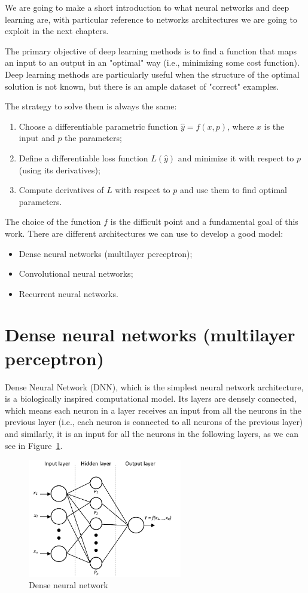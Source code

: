We are going to make a short introduction to what neural networks and deep learning are, with particular reference to networks architectures we are going to exploit in the next chapters.

The primary objective of deep learning methods is to find a function that maps an input to an output in an "optimal" way (i.e., minimizing some cost function). Deep learning methods are particularly useful when the structure of the optimal solution is not known, but there is an ample dataset of "correct" examples.

The strategy to solve them is always the same: 
\begin{enumerate}
    \item Choose a differentiable parametric function $\hat{y} = f(x,p)$, where $x$ is the input and $p$ the parameters;
    \item Define a differentiable loss function $L(\hat{y})$ and minimize it with respect to $p$ (using its derivatives);
    \item Compute derivatives of $L$ with respect to $p$ and use them to find optimal parameters.
\end{enumerate}

The choice of the function $f$ is the difficult point and a fundamental goal of this work. There are different architectures we can use to develop a good model:
\begin{itemize}
    \item Dense neural networks (multilayer perceptron);
    \item Convolutional neural networks;
    \item Recurrent neural networks.
\end{itemize}

\section{Dense neural networks (multilayer perceptron)}
Dense Neural Network (DNN), which is the simplest neural network architecture, is a biologically inspired computational model. Its layers are densely connected, which means each neuron in a layer receives an input from all the neurons in the previous layer (i.e., each neuron is connected to all neurons of the previous layer) and similarly, it is an input for all the neurons in the following layers, as we can see in Figure~\ref{fig:DNN}.

\begin{figure}[H]
    \centering
    \includegraphics[width=0.6\textwidth]{Images/DNN.png}
    \caption{Dense neural network}
    \label{fig:DNN}
\end{figure}


